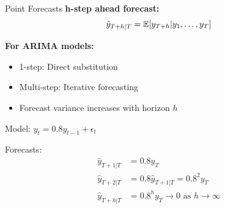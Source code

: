 \documentclass[aspectratio=169]{beamer}
\begin{document}
\begin{frame}{Point Forecasts}
  \textbf{h-step ahead forecast:}
  \begin{equation}
    \hat{y}_{T+h|T} = \mathbb{E}[y_{T+h} | y_1, \ldots, y_T]
  \end{equation}

  \vspace{0.5em}

  \textbf{For ARIMA models:}
  \begin{itemize}
    \item 1-step: Direct substitution
    \item Multi-step: Iterative forecasting
    \item Forecast variance increases with horizon $h$
  \end{itemize}

  \vspace{0.5em}

  \begin{examplebox}[title={AR(1) Forecast}]
    Model: $y_t = 0.8 y_{t-1} + \epsilon_t$

    Forecasts:
    \begin{align*}
      \hat{y}_{T+1|T} &= 0.8 y_T \\
      \hat{y}_{T+2|T} &= 0.8 \hat{y}_{T+1|T} = 0.8^2 y_T \\
      \hat{y}_{T+h|T} &= 0.8^h y_T \to 0 \text{ as } h \to \infty
    \end{align*}
  \end{examplebox}
\end{frame}
\end{document}
